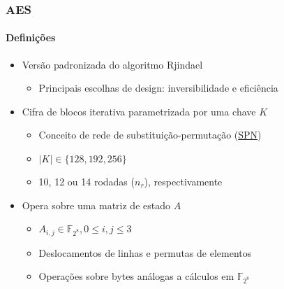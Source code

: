 \documentclass[12pt]{beamer}
\begin{document}
\begin{frame}
    \frametitle{AES}
    \framesubtitle{Definições}
    \begin{itemize}
        \item Versão padronizada do algoritmo Rjindael \cite{Daemen:2002:DR:560131}
        \begin{itemize}
            \item Principais escolhas de design: inversibilidade e eficiência
        \end{itemize}
        \item Cifra de blocos iterativa parametrizada por uma chave $K$
        \begin{itemize}
            \item Conceito de rede de substituição-permutação (\href{https://www.iacr.org/authors/tikz/tikz/Construction/spn.pdf}{SPN})
            \item $\vert K \vert \in \{128, 192, 256\}$
            \item 10, 12 ou 14 rodadas ($n_r$), respectivamente
        \end{itemize}
        \item Opera sobre uma matriz de estado $A$
        \begin{itemize}
            \item $A_{i,j} \in \mathbb{F}_{2^8}, 0 \leq i, j \leq 3$
            \item Deslocamentos de linhas e permutas de elementos
            \item Operações sobre bytes análogas a cálculos em $\mathbb{F}_{2^8}$
        \end{itemize}
    \end{itemize}
\end{frame}
\end{document}
